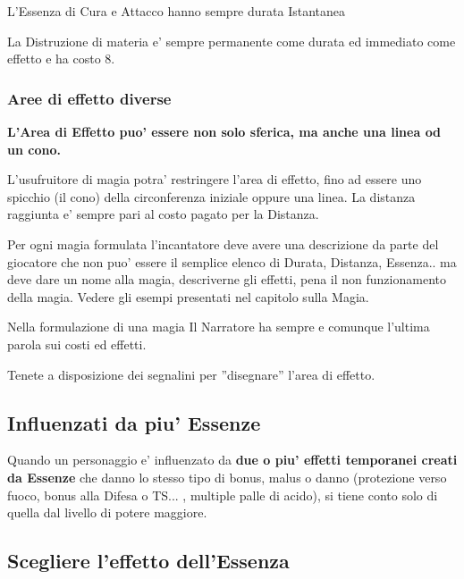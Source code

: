 \documentclass[a4paper,11pt,twoside,openany]{book}
\begin{document}
	L'Essenza di Cura e Attacco hanno sempre durata Istantanea
	
	La Distruzione di materia e' sempre permanente come durata ed immediato come effetto e ha costo 8.
	
	\subsubsection{Aree di effetto diverse}
	
	\label{aree-di-effetto-diverse}
	
	\textbf{L'Area di Effetto puo' essere non solo sferica, ma anche una linea od un cono.}
	
	L'usufruitore di magia potra' restringere l'area di effetto, fino ad essere uno spicchio (il cono) della circonferenza iniziale oppure una linea. La distanza raggiunta e' sempre pari al costo pagato per la Distanza.
	
	Per ogni magia formulata l'incantatore deve avere una descrizione da parte del giocatore che non puo' essere il semplice elenco di Durata, Distanza, Essenza.. ma deve dare un nome alla magia, descriverne gli effetti, pena il non funzionamento della magia. Vedere gli esempi presentati nel capitolo sulla Magia.
	
	Nella formulazione di una magia Il Narratore ha sempre e comunque l'ultima parola sui costi ed effetti.
	
	Tenete a disposizione dei segnalini per ''disegnare'' l'area di effetto.
	
	\subsection{Influenzati da piu' Essenze}
	
	\label{influenzati-da-piu-essenze}
	
	Quando un personaggio e' influenzato da \textbf{due o piu' effetti temporanei creati da Essenze} che danno lo stesso tipo di bonus, malus o danno (protezione verso fuoco, bonus alla Difesa o TS... , multiple palle di acido), si tiene conto solo di quella dal livello di potere maggiore.
	
	\subsection{Scegliere l'effetto dell'Essenza}
	
	\label{scegliere-leffetto-dellessenza}
	
\end{document}
